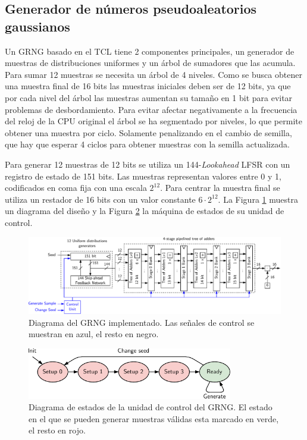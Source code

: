 \subsection{Generador de números pseudoaleatorios gaussianos}

Un GRNG basado en el TCL tiene 2 componentes principales, un generador de muestras de distribuciones uniformes y un árbol de sumadores que las acumula. Para sumar 12 muestras se necesita un árbol de 4 niveles. Como se busca obtener una muestra final de 16 bits las muestras iniciales deben ser de 12 bits, ya que por cada nivel del árbol las muestras aumentan su tamaño en 1 bit para evitar problemas de desbordamiento. Para evitar afectar negativamente a la frecuencia del reloj de la CPU original el árbol se ha segmentado por niveles, lo que permite obtener una muestra por ciclo. Solamente penalizando en el cambio de semilla, que hay que esperar 4 ciclos para obtener muestras con la semilla actualizada.

Para generar 12 muestras de 12 bits se utiliza un 144-\textit{Lookahead} LFSR con un registro de estado de 151 bits. Las muestras representan valores entre 0 y 1, codificados en coma fija con una escala $2^{12}$. Para centrar la muestra final se utiliza un restador de 16 bits con un valor constante $6 \cdot 2^{12}$. La Figura \ref{fig:grng} muestra un diagrama del diseño y la Figura \ref{fig:grng_state} la máquina de estados de su unidad de control.

\begin{figure}[h]
    \centering
    \includegraphics[width=\textwidth]{root/Imagenes/5_riscv/grng.pdf}
    \caption{Diagrama del GRNG implementado. Las señales de control se muestran en azul, el resto en negro.}
    \label{fig:grng}
\end{figure}

\begin{figure}[h]
    \centering
    \includegraphics[width=0.8\textwidth]{root/Imagenes/5_riscv/grng_states.pdf}
    \caption{Diagrama de estados de la unidad de control del GRNG. El estado en el que se pueden generar muestras válidas esta marcado en verde, el resto en rojo.}
    \label{fig:grng_state}
\end{figure}

